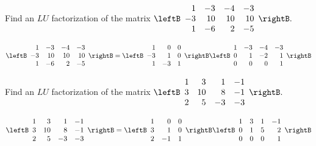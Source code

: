 \begin{enumialphparenastyle}
\begin{ex} Find an $LU$ factorization of the matrix $\allowbreak \allowbreak
\leftB 
\begin{array}{rrrr}
1 & -3 & -4 & -3 \\ 
-3 & 10 & 10 & 10 \\ 
1 & -6 & 2 & -5
\end{array}
 \rightB .$
\begin{sol}
\[
 \leftB
\begin{array}{rrrr}
1 & -3 & -4 & -3 \\
-3 & 10 & 10 & 10 \\
1 & -6 & 2 & -5
\end{array} \rightB = \leftB
\begin{array}{rrr}
1 & 0 & 0 \\
-3 & 1 & 0 \\
1 & -3 & 1
\end{array}
\rightB \leftB
\begin{array}{rrrr}
1 & -3 & -4 & -3 \\
0 & 1 & -2 & 1 \\
0 & 0 & 0 & 1
\end{array}
\rightB 
\]
\end{sol}
\end{ex}


\begin{ex} Find an $LU$ factorization of the matrix 
$\leftB 
\begin{array}{rrrr}
1 & 3 & 1 & -1 \\ 
3 & 10 & 8 & -1 \\ 
2 & 5 & -3 & -3
\end{array}
 \rightB .$
\begin{sol}
\[
\leftB
\begin{array}{rrrr}
1 & 3 & 1 & -1 \\
3 & 10 & 8 & -1 \\
2 & 5 & -3 & -3
\end{array}
 \rightB = \leftB
\begin{array}{rrr}
1 & 0 & 0 \\
3 & 1 & 0 \\
2 & -1 & 1
\end{array}
\rightB \leftB
\begin{array}{rrrr}
1 & 3 & 1 & -1 \\
0 & 1 & 5 & 2 \\
0 & 0 & 0 & 1
\end{array}
\rightB 
\]
\end{sol}
\end{ex}


\end{enumialphparenastyle}
